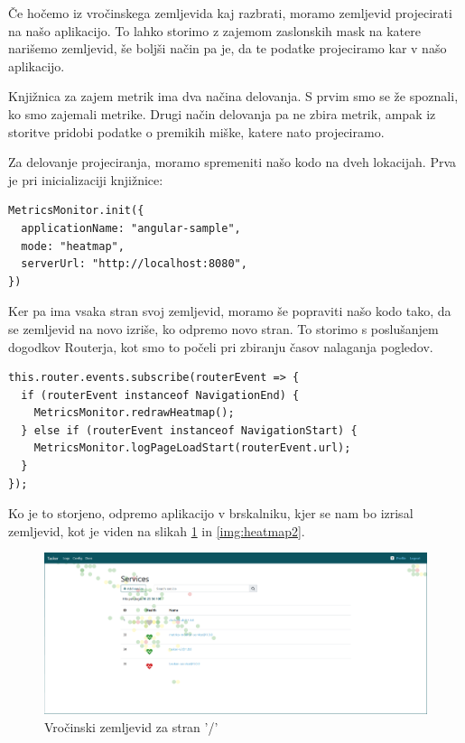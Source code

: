 \documentclass[a4paper, 12pt]{book}
\begin{document}
Če hočemo iz vročinskega zemljevida kaj razbrati, moramo zemljevid projecirati na našo aplikacijo. To lahko storimo z zajemom zaslonskih mask na katere narišemo zemljevid, še boljši način pa je, da te podatke projeciramo kar v našo aplikacijo.

Knjižnica za zajem metrik ima dva načina delovanja. S prvim smo se že spoznali, ko smo zajemali metrike. Drugi način delovanja pa ne zbira metrik, ampak iz storitve pridobi podatke o premikih miške, katere nato projeciramo.

Za delovanje projeciranja, moramo spremeniti našo kodo na dveh lokacijah. Prva je pri inicializaciji knjižnice:

\begin{lstlisting}[label=heatmap_init, caption=Sprememba načina delovanja knjižnice]
MetricsMonitor.init({
  applicationName: "angular-sample",
  mode: "heatmap",
  serverUrl: "http://localhost:8080",
})
\end{lstlisting}

Ker pa ima vsaka stran svoj zemljevid, moramo še popraviti našo kodo tako, da se zemljevid na novo izriše, ko odpremo novo stran. To storimo s poslušanjem dogodkov Routerja, kot smo to počeli pri zbiranju časov nalaganja pogledov.

\begin{lstlisting}[label=heatmap_redraw, caption=Sprememba zemljevida ob prehodu na novo stran]
this.router.events.subscribe(routerEvent => {
  if (routerEvent instanceof NavigationEnd) {
    MetricsMonitor.redrawHeatmap();
  } else if (routerEvent instanceof NavigationStart) {
    MetricsMonitor.logPageLoadStart(routerEvent.url);
  }	
});
\end{lstlisting}

Ko je to storjeno, odpremo aplikacijo v brskalniku, kjer se nam bo izrisal zemljevid, kot je viden na slikah \ref{img:heatmap1} in \ref{img:heatmap2}.

\begin{figure}[h]
	\begin{center}
		\includegraphics[width=1\textwidth]{heatmap_1.png}
	\end{center}
	\caption{Vročinski zemljevid za stran '/'}
	\label{img:heatmap1}
\end{figure}
\end{document}

